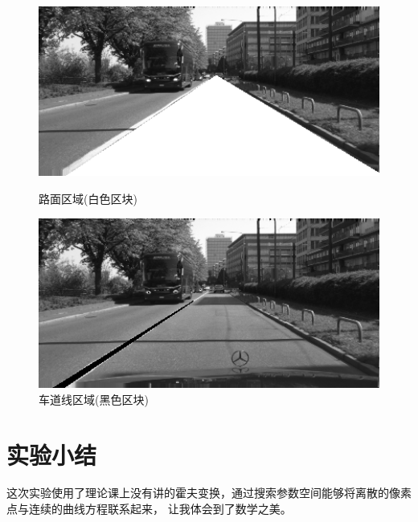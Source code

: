 \documentclass[a4paper]{ctexart}
\begin{document}
    \newpage
    \begin{figure}[H]
      \includegraphics*[width=1.0\textwidth]{fig/road.png}
      \caption{路面区域(白色区块)}
      \includegraphics*[width=1.0\textwidth]{fig/line.png}
      \caption{车道线区域(黑色区块)}
    \end{figure}

  \section{实验小结}
  这次实验使用了理论课上没有讲的霍夫变换，通过搜索参数空间能够将离散的像素点与连续的曲线方程联系起来，
  让我体会到了数学之美。
\end{document}
